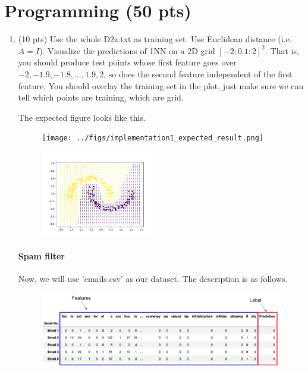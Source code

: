 \documentclass[a4paper]{article}
\theoremstyle{definition}
\newenvironment{soln}{
    \leavevmode\color{blue}\ignorespaces
}{}
\begin{document}
\section{Programming (50 pts)}
\begin{enumerate}
	\item (10 pts) Use the whole D2z.txt as training set.  Use Euclidean distance (i.e. $A=I$).
	Visualize the predictions of 1NN on a 2D grid $[-2:0.1:2]^2$.
	That is, you should produce test points whose first feature goes over $-2, -1.9, -1.8, \ldots, 1.9, 2$, so does the second feature independent of the first feature.
	You should overlay the training set in the plot, just make sure we can tell which points are training, which are grid.
	
	The expected figure looks like this.
	\begin{figure}[h]
		\centering
		\texttt{[image: ../figs/implementation1\_expected\_result.png]}
	\end{figure}

	\begin{soln}
		\begin{figure}[H]
			\centering
			\includegraphics[width=5cm]{../figs/knn_d2z_plot.png}
		\end{figure}
	\end{soln}
	
	\paragraph{Spam filter} Now, we will use 'emails.csv' as our dataset. The description is as follows.
	\begin{figure}[h]
		\centering
		\includegraphics[width=\linewidth]{../figs/email_head.png}
	\end{figure}
	

\end{enumerate}
\end{document}
